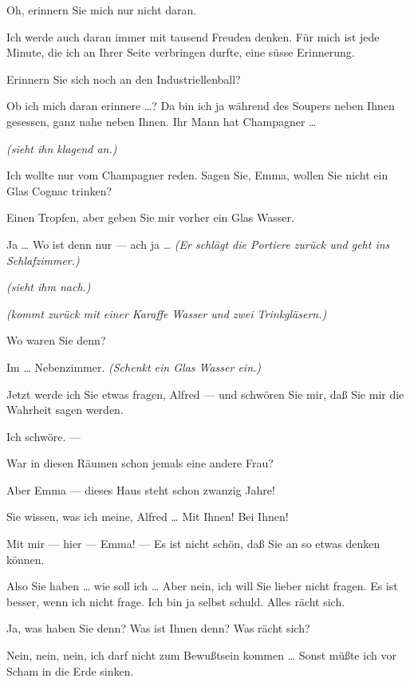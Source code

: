 \documentclass[
	final,
	a4paper,
	ngerman,
	mpinclude = true, %
	twoside = true,
	open = right,
	cleardoublepage = plain,
	DIV = 13,
	BCOR = 1cm,
	titlepage = firstiscover,
	]{scrbook}
\newcommand{\direction}[1]{\textit{(#1)}}
\newcommand{\thecharacter}[1]{\textup{\textsc{#1}}}
\newcommand{\theherr}{\thecharacter{Junger Herr}}
\newcommand{\thefrau}{\thecharacter{Junge Frau}}
\newcommand{\character}[1]{\item[#1:]}
\newcommand{\herr}{\character{\theherr}}
\newcommand{\frau}{\character{\thefrau}}
\begin{document}
\begin{play}
	\frau
	Oh, erinnern Sie mich nur nicht daran.

	\herr
	Ich werde auch daran immer mit tausend Freuden denken. Für mich ist jede Minute, die ich an Ihrer Seite verbringen durfte, eine süsse Erinnerung.

	\frau
	Erinnern Sie sich noch an den Industriellenball?

	\herr
	Ob ich mich daran erinnere \ldots{}? Da bin ich ja während des Soupers neben Ihnen gesessen, ganz nahe neben Ihnen. Ihr Mann hat Champagner \ldots{}

	\frau
	\direction{sieht ihn klagend an.}

	\herr
	Ich wollte nur vom Champagner reden. Sagen Sie, Emma, wollen Sie nicht ein Glas Cognac trinken?

	\frau
	Einen Tropfen, aber geben Sie mir vorher ein Glas Wasser.

	\herr
	Ja \ldots{} Wo ist denn nur --- ach ja \ldots{} \direction{Er schlägt die Portiere zurück und geht ins Schlafzimmer.}

	\frau
	\direction{sieht ihm nach.}

	\herr
	\direction{kommt zurück mit einer Karaffe Wasser und zwei Trinkgläsern.}

	\frau
	Wo waren Sie denn?

	\herr
	Im \ldots{} Nebenzimmer. \direction{Schenkt ein Glas Wasser ein.}

	\frau
	Jetzt werde ich Sie etwas fragen, Alfred --- und schwören Sie mir, daß Sie mir die Wahrheit sagen werden.

	\herr
	Ich schwöre. ---

	\frau
	War in diesen Räumen schon jemals eine andere Frau?

	\herr
	Aber Emma --- dieses Haus steht schon zwanzig Jahre!

	\frau
	Sie wissen, was ich meine, Alfred \ldots{} Mit Ihnen! Bei Ihnen!

	\herr
	Mit mir --- hier --- Emma! --- Es ist nicht schön, daß Sie an so etwas denken können.

	\frau
	Also Sie haben \ldots{} wie soll ich \ldots{} Aber nein, ich will Sie lieber nicht fragen. Es ist besser, wenn ich nicht frage. Ich bin ja selbst schuld. Alles rächt sich.

	\herr
	Ja, was haben Sie denn? Was ist Ihnen denn? Was rächt sich?

	\frau
	Nein, nein, nein, ich darf nicht zum Bewußtsein kommen \ldots{} Sonst müßte ich vor Scham in die Erde sinken.


\end{play}
\end{document}

